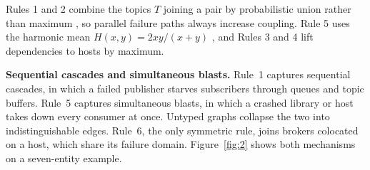 \documentclass[preprint,3p]{elsarticle}
\begin{document}
\begin{table}[htbp]
\centering
\small
\caption{The six \texttt{DEPENDS\_ON} logical dependency projection rules.}
\label{tab:2}
\end{table}

Rules 1 and 2 combine the topics $T$ joining a pair by probabilistic union rather than maximum \cite{pearl1988probabilistic,beliakov2007aggregation,yager1988owa}, so parallel failure paths always increase coupling. Rule 5 uses the harmonic mean $H(x, y) = 2xy/(x+y)$ \cite{hardy1952inequalities}, and Rules 3 and 4 lift dependencies to hosts by maximum.

\noindent\textbf{Sequential cascades and simultaneous blasts.} Rule~1 captures sequential cascades, in which a failed publisher starves subscribers through queues and topic buffers. Rule~5 captures simultaneous blasts, in which a crashed library or host takes down every consumer at once. Untyped graphs collapse the two into indistinguishable edges. Rule~6, the only symmetric rule, joins brokers colocated on a host, which share its failure domain. Figure~\ref{fig:2} shows both mechanisms on a seven-entity example.
\end{document}
